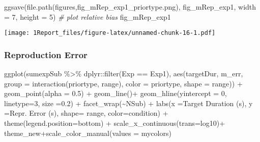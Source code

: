 \documentclass[
]{article}
\newenvironment{Shaded}{\begin{snugshade}}{\end{snugshade}}
\newcommand{\AttributeTok}[1]{\textcolor[rgb]{0.77,0.63,0.00}{#1}}
\newcommand{\CommentTok}[1]{\textcolor[rgb]{0.56,0.35,0.01}{\textit{#1}}}
\newcommand{\DecValTok}[1]{\textcolor[rgb]{0.00,0.00,0.81}{#1}}
\newcommand{\FloatTok}[1]{\textcolor[rgb]{0.00,0.00,0.81}{#1}}
\newcommand{\FunctionTok}[1]{\textcolor[rgb]{0.00,0.00,0.00}{#1}}
\newcommand{\NormalTok}[1]{#1}
\newcommand{\SpecialCharTok}[1]{\textcolor[rgb]{0.00,0.00,0.00}{#1}}
\newcommand{\StringTok}[1]{\textcolor[rgb]{0.31,0.60,0.02}{#1}}
\begin{document}
\begin{Shaded}
\begin{Highlighting}[]
\FunctionTok{ggsave}\NormalTok{(}\FunctionTok{file.path}\NormalTok{(}\StringTok{\textquotesingle{}figures\textquotesingle{}}\NormalTok{,}\StringTok{\textquotesingle{}fig\_mRep\_exp1\_priortype.png\textquotesingle{}}\NormalTok{), fig\_mRep\_exp1, }\AttributeTok{width =} \DecValTok{7}\NormalTok{, }\AttributeTok{height =} \DecValTok{5}\NormalTok{)}
\CommentTok{\# plot relative bias}
\NormalTok{fig\_mRep\_exp1}
\end{Highlighting}
\end{Shaded}

\texttt{[image: 1Report\_files/figure-latex/unnamed-chunk-16-1.pdf]}

\hypertarget{reproduction-error}{%
\subsubsection{Reproduction Error}\label{reproduction-error}}

\begin{Shaded}
\begin{Highlighting}[]
\FunctionTok{ggplot}\NormalTok{(sumexpSub }\SpecialCharTok{\%\textgreater{}\%}\NormalTok{ dplyr}\SpecialCharTok{::}\FunctionTok{filter}\NormalTok{(Exp }\SpecialCharTok{==} \StringTok{\textquotesingle{}Exp1\textquotesingle{}}\NormalTok{), }\FunctionTok{aes}\NormalTok{(targetDur, m\_err, }\AttributeTok{group =} \FunctionTok{interaction}\NormalTok{(priortype, range), }\AttributeTok{color =}\NormalTok{ priortype, }\AttributeTok{shape =}\NormalTok{ range)) }\SpecialCharTok{+} 
  \FunctionTok{geom\_point}\NormalTok{(}\AttributeTok{alpha =} \FloatTok{0.5}\NormalTok{) }\SpecialCharTok{+} 
  \FunctionTok{geom\_line}\NormalTok{()}\SpecialCharTok{+}
  \FunctionTok{geom\_hline}\NormalTok{(}\AttributeTok{yintercept =} \DecValTok{0}\NormalTok{, }\AttributeTok{linetype=}\DecValTok{3}\NormalTok{, }\AttributeTok{size =}\FloatTok{0.2}\NormalTok{) }\SpecialCharTok{+}
  \FunctionTok{facet\_wrap}\NormalTok{(}\SpecialCharTok{\textasciitilde{}}\NormalTok{NSub) }\SpecialCharTok{+}
  \FunctionTok{labs}\NormalTok{(}\AttributeTok{x =}\StringTok{\textquotesingle{}Target Duration (s)\textquotesingle{}}\NormalTok{, }\AttributeTok{y =}\StringTok{\textquotesingle{}Repr. Error (s)\textquotesingle{}}\NormalTok{,  }\AttributeTok{shape=} \StringTok{\textquotesingle{}range\textquotesingle{}}\NormalTok{, }\AttributeTok{color=}\StringTok{\textquotesingle{}condition\textquotesingle{}}\NormalTok{) }\SpecialCharTok{+} \FunctionTok{theme}\NormalTok{(}\AttributeTok{legend.position=}\StringTok{\textquotesingle{}bottom\textquotesingle{}}\NormalTok{) }\SpecialCharTok{+} 
  \FunctionTok{scale\_x\_continuous}\NormalTok{(}\AttributeTok{trans=}\StringTok{\textquotesingle{}log10\textquotesingle{}}\NormalTok{)}\SpecialCharTok{+}
\NormalTok{  theme\_new}\SpecialCharTok{+}\FunctionTok{scale\_color\_manual}\NormalTok{(}\AttributeTok{values =}\NormalTok{ mycolors) }
\end{Highlighting}
\end{Shaded}
\end{document}
